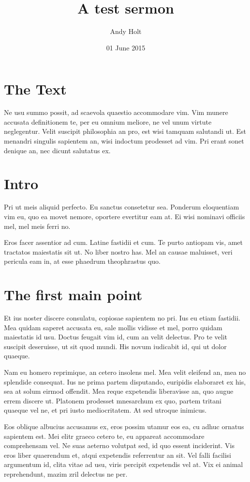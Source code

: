 \documentclass{adhsernotes}
\title{A test sermon}
\author{Andy Holt}
\date{01 June 2015}
\begin{document}
\maketitle

\section*{The Text}
Ne usu summo possit, ad scaevola quaestio accommodare vim. Vim munere accusata
definitionem te, per eu omnium meliore, ne vel unum virtute neglegentur. Velit
suscipit philosophia an pro, est wisi tamquam salutandi ut. Est menandri
singulis sapientem an, wisi indoctum prodesset ad vim. Pri erant sonet denique
an, nec dicunt salutatus ex.

\section*{Intro}
Pri ut meis aliquid perfecto. Eu sanctus consetetur sea. Ponderum eloquentiam
vim eu, quo ea movet nemore, oportere evertitur eam at. Ei wisi nominavi
officiis mel, mel meis ferri no.

Eros facer assentior ad cum. Latine fastidii et cum. Te purto antiopam vis, amet
tractatos maiestatis sit ut. No liber nostro has. Mel an causae maluisset, veri
pericula eam in, at esse phaedrum theophrastus quo.

\section{The first main point}
Et ius noster discere consulatu, copiosae sapientem no pri. Ius eu etiam
fastidii. Mea quidam saperet accusata eu, sale mollis vidisse et mel, porro
quidam maiestatis id usu. Doctus feugait vim id, cum an velit delectus. Pro te
velit suscipit deseruisse, ut sit quod mundi. His novum iudicabit id, qui ut
dolor quaeque.

Nam eu homero reprimique, an cetero insolens mel. Mea velit eleifend an, mea no
splendide consequat. Ius ne prima partem disputando, euripidis elaboraret ex
his, sea at solum eirmod offendit. Mea reque expetendis liberavisse an, quo
augue errem discere ut. Platonem prodesset mnesarchum ex quo, partem tritani
quaeque vel ne, et pri iusto mediocritatem. At sed utroque inimicus.

Eos oblique albucius accusamus ex, eros possim utamur eos ea, cu adhuc ornatus
sapientem est. Mei elitr graeco cetero te, eu appareat accommodare comprehensam
vel. Ne suas aeterno volutpat sed, id quo essent inciderint. Vis eros liber
quaerendum et, atqui expetendis referrentur an sit. Vel falli facilisi
argumentum id, clita vitae ad usu, viris percipit expetendis vel at. Vix ei
animal reprehendunt, mazim zril delectus ne per.
\end{document}
